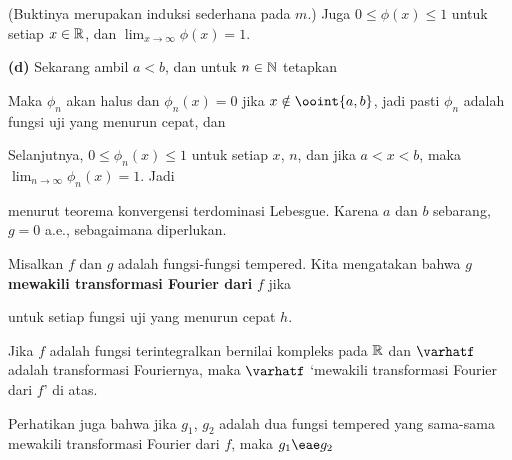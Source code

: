 {

\noindent (Buktinya merupakan induksi sederhana pada $m$.) Juga
$0\le\phi(x)\le 1$
untuk setiap $x\in\Bbb R$, dan $\lim_{x\to\infty}\phi(x)=1$.

\medskip

{\bf (d)} Sekarang ambil $a<b$, dan untuk $n\in\Bbb N$ tetapkan


\noindent Maka $\phi_n$ akan halus dan $\phi_n(x)=0$ jika
$x\notin\ooint{a,b}$, jadi pasti $\phi_n$ adalah fungsi uji yang menurun
cepat, dan


\noindent Selanjutnya, $0\le\phi_n(x)\le 1$ untuk setiap $x$, $n$, dan jika
$a<x<b$, maka $\lim_{n\to\infty}\phi_n(x)=1$. Jadi


\noindent menurut teorema konvergensi terdominasi Lebesgue. Karena $a$ dan $b$
sebarang, $g=0$ a.e., sebagaimana diperlukan. }%

 Misalkan $f$ dan $g$ adalah fungsi-fungsi
tempered. Kita mengatakan bahwa $g$ {\bf mewakili
transformasi Fourier dari} $f$ jika


\noindent untuk setiap fungsi uji yang menurun cepat $h$.

 Jika $f$ adalah fungsi
terintegralkan bernilai kompleks pada $\Bbb R$ dan $\varhatf$ adalah
transformasi Fouriernya, maka  $\varhatf$ `mewakili transformasi Fourier dari $f$'  di atas.

 Perhatikan juga bahwa  jika
$g_1$, $g_2$ adalah dua fungsi tempered yang sama-sama mewakili transformasi
Fourier dari $f$, maka $g_1\eae g_2$

